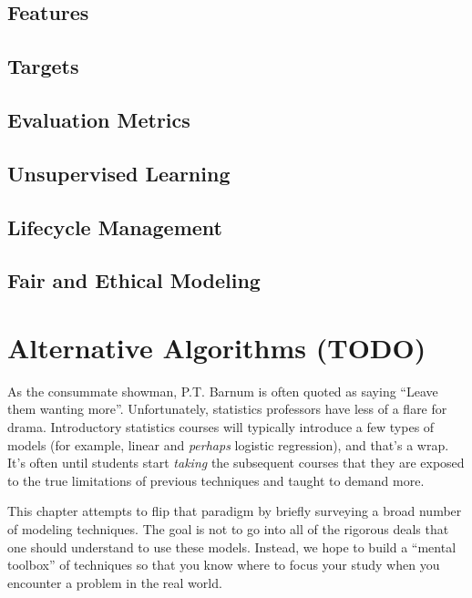 \documentclass[
]{krantz}
\begin{document}
\hypertarget{features}{%
\section{Features}\label{features}}

\hypertarget{targets}{%
\section{Targets}\label{targets}}

\hypertarget{evaluation-metrics}{%
\section{Evaluation Metrics}\label{evaluation-metrics}}

\hypertarget{unsupervised-learning}{%
\section{Unsupervised Learning}\label{unsupervised-learning}}

\hypertarget{lifecycle-management}{%
\section{Lifecycle Management}\label{lifecycle-management}}

\hypertarget{fair-and-ethical-modeling}{%
\section{Fair and Ethical Modeling}\label{fair-and-ethical-modeling}}

\hypertarget{alt-alg}{%
\chapter{Alternative Algorithms (TODO)}\label{alt-alg}}

As the consummate showman, P.T. Barnum is often quoted as saying ``Leave them wanting more''. Unfortunately, statistics professors have less of a flare for drama. Introductory statistics courses will typically introduce a few types of models (for example, linear and \emph{perhaps} logistic regression), and that's a wrap. It's often until students start \emph{taking} the subsequent courses that they are exposed to the true limitations of previous techniques and taught to demand more.

This chapter attempts to flip that paradigm by briefly surveying a broad number of modeling techniques. The goal is not to go into all of the rigorous deals that one should understand to use these models. Instead, we hope to build a ``mental toolbox'' of techniques so that you know where to focus your study when you encounter a problem in the real world.
\end{document}
